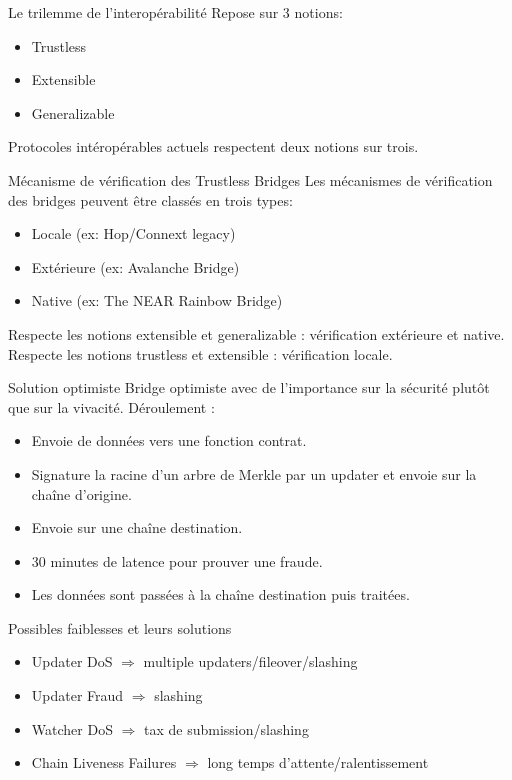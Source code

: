\begin{frame}{Le trilemme de l’interopérabilité}
Repose sur 3 notions: 
\begin{itemize}
    \item Trustless
    \item Extensible
    \item Generalizable
\end{itemize}
Protocoles intéropérables actuels respectent deux notions sur trois.
\end{frame}

\begin{frame}{Mécanisme de vérification des Trustless Bridges}
Les mécanismes de vérification des bridges peuvent être classés en trois types:
\begin{itemize}
    \item Locale (ex: Hop/Connext legacy)
    \item Extérieure (ex: Avalanche Bridge)
    \item Native (ex: The NEAR Rainbow Bridge)
\end{itemize}
Respecte les notions extensible et generalizable : vérification extérieure et native. \newline
Respecte les notions trustless et extensible : vérification locale.  
\end{frame}

\begin{frame}{Solution optimiste}
Bridge optimiste avec de l'importance sur la sécurité plutôt que sur la vivacité.
Déroulement : \newline
\begin{itemize}
    \item Envoie de données vers une fonction contrat.
    \item Signature la racine d'un arbre de Merkle par un updater et envoie sur la chaîne d'origine. 
    \item Envoie sur une chaîne destination. 
    \item 30 minutes de latence pour prouver une fraude.
    \item Les données sont passées à la chaîne destination puis traitées.
\end{itemize}
    
\end{frame}

\begin{frame}{Possibles faiblesses et leurs solutions}
\begin{itemize}
    \item Updater DoS $\Rightarrow$ multiple updaters/fileover/slashing
    \item Updater Fraud $\Rightarrow$ slashing 
    \item Watcher DoS $\Rightarrow$ tax de submission/slashing
    \item Chain Liveness Failures $\Rightarrow$ long temps d'attente/ralentissement
\end{itemize}
\end{frame}
